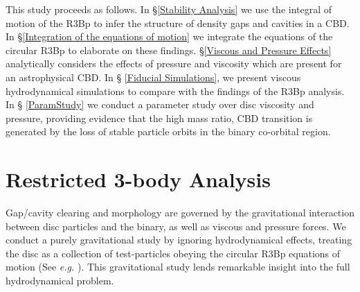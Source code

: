 This study proceeds as follows. In \S \ref{Stability Analysis} we use
the integral of motion of the R3Bp to infer the structure of density
gaps and cavities in a CBD. In \S \ref{Integration
  of the equations of motion} we integrate the equations of the
circular R3Bp to elaborate on these findings. \S \ref{Viscous and
  Pressure Effects} analytically considers the effects of pressure and
viscosity which are present for an astrophysical CBD. In \S
\ref{Fiducial Simulations}, we present viscous hydrodynamical
simulations to compare with the findings of the R3Bp analysis. In \S
\ref{ParamStudy} we conduct a parameter study over disc viscosity and
pressure, providing evidence that the high mass ratio, CBD transition
is generated by the loss of stable particle orbits in the binary
co-orbital region.


\section{Restricted 3-body Analysis}
\label{Analysis via the restricted 3-body problem}
Gap/cavity clearing and morphology are governed by the gravitational
interaction between disc particles and the binary, as well as viscous
and pressure forces. We conduct a purely gravitational study by
ignoring hydrodynamical effects, treating the disc as a collection of
test-particles obeying the circular R3Bp equations of motion (See
\textit{e.g.} \cite{MD:SSD}). This gravitational study lends
remarkable insight into the full hydrodynamical problem.



